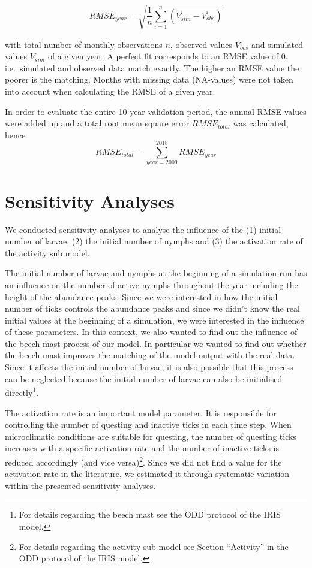 \documentclass[a4paper, 11pt]{scrartcl}
\begin{document}
\begin{equation}\label{eq:rmse}
RMSE_{year} = \sqrt{ \frac{1}{n} \sum_{i=1}^n (V_{sim}^i - V_{obs}^i)}
\end{equation}

with total number of monthly observations $n$, observed values $V_{obs}$ and simulated values $V_{sim}$ of a given year. A perfect fit corresponds to an RMSE value of 0, i.e.\
simulated and observed data match exactly. The higher an RMSE value the poorer is the matching. Months with missing data (NA-values) were not taken into account when
calculating the RMSE of a given year.

In order to evaluate the entire 10-year validation period, the annual RMSE values were added up and a total root mean square error $RMSE_{total}$ was calculated, hence
\begin{equation}\label{eq:total_rmse}
RMSE_{total} = \sum_{year=2009}^{2018} RMSE_{year}
\end{equation}


\section{Sensitivity Analyses}
We conducted sensitivity analyses to analyse the influence of the (1) initial number of larvae, (2) the initial number of nymphs and (3) the activation rate of the activity sub
model.

The initial number of larvae and nymphs at the beginning of a simulation run has an influence on the number of active nymphs throughout the year including the height of the
abundance peaks. Since we were interested in how the initial number of ticks controls the abundance peaks and since we didn't know the real initial values at the beginning of a
simulation, we were interested in the influence of these parameters. In this context, we also wanted to find out the influence of the beech mast process of our model. In
particular we wanted to find out whether the beech mast improves the matching of the model output with the real data.  Since it affects the initial number of larvae, it
is also possible that this process can be neglected because the initial number of larvae can also be initialised directly\footnote{For details regarding the beech mast
see the ODD protocol of the IRIS model.}.

The activation rate is an important model parameter. It is responsible for controlling the number of questing and inactive ticks in each time step. When microclimatic
conditions are suitable for questing, the number of questing ticks increases with a specific activation rate and the number of inactive ticks is reduced accordingly (and vice
versa)\footnote{For details regarding the activity sub model see Section ``Activity'' in the ODD protocol of the IRIS model.}. Since we did not find a value for the activation
rate in the literature, we estimated it through systematic variation within the presented sensitivity analyses.
\end{document}
